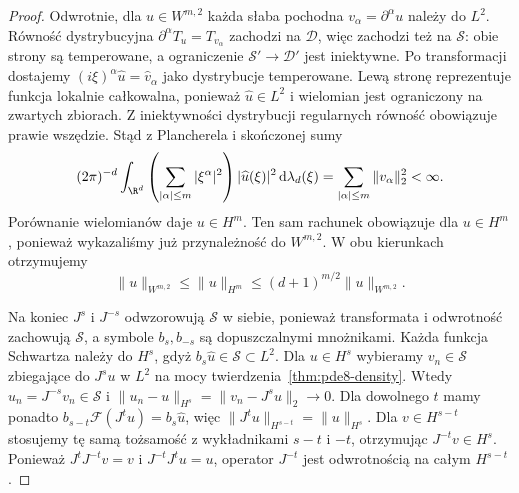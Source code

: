 \begin{proof}
Odwrotnie, dla $u\in W^{m,2}$ każda słaba
pochodna $v_\alpha=\partial^\alpha u$ należy
do $L^2$. Równość dystrybucyjna
$\partial^\alpha T_u=T_{v_\alpha}$ zachodzi
na $\mathcal D$, więc zachodzi też na $\mathcal S$:
obie strony są temperowane, a ograniczenie
$\mathcal S'\to\mathcal D'$ jest iniektywne.
Po transformacji dostajemy
$(i\xi)^\alpha\widehat u=\widehat v_\alpha$
jako dystrybucje temperowane.
Lewą stronę reprezentuje funkcja lokalnie
całkowalna, ponieważ $\widehat u\in L^2$
i wielomian jest ograniczony na zwartych zbiorach.
Z iniektywności dystrybucji regularnych
równość obowiązuje prawie wszędzie.
Stąd z Plancherela i skończonej sumy
\[
 (2\pi)^{-d}\int_{\R^d}
 \left(\sum_{|\alpha|\le m}|\xi^\alpha|^2\right)
 |\widehat u(\xi)|^2\,\mathrm d\lambda_d(\xi)
 =\sum_{|\alpha|\le m}\|v_\alpha\|_2^2<\infty.
\]
Porównanie wielomianów daje $u\in H^m$.
Ten sam rachunek obowiązuje dla $u\in H^m$,
ponieważ wykazaliśmy już przynależność
do $W^{m,2}$. W obu kierunkach otrzymujemy
\[
 \|u\|_{W^{m,2}}\le\|u\|_{H^m}
 \le(d+1)^{m/2}\|u\|_{W^{m,2}}.
\]

Na koniec $J^s$ i $J^{-s}$ odwzorowują
$\mathcal S$ w siebie, ponieważ transformata
i odwrotność zachowują $\mathcal S$,
a symbole $b_s,b_{-s}$ są dopuszczalnymi
mnożnikami. Każda funkcja Schwartza należy
do $H^s$, gdyż $b_s\widehat u\in\mathcal S\subset L^2$.
Dla $u\in H^s$ wybieramy $v_n\in\mathcal S$
zbiegające do $J^su$ w $L^2$ na mocy
twierdzenia~\ref{thm:pde8-density}. Wtedy
$u_n=J^{-s}v_n\in\mathcal S$ i
$\|u_n-u\|_{H^s}=\|v_n-J^su\|_2\to0$.
Dla dowolnego $t$ mamy ponadto
$b_{s-t}\mathcal F(J^tu)=b_s\widehat u$,
więc $\|J^tu\|_{H^{s-t}}=\|u\|_{H^s}$.
Dla $v\in H^{s-t}$ stosujemy tę samą tożsamość
z wykładnikami $s-t$ i $-t$, otrzymując
$J^{-t}v\in H^s$.
Ponieważ $J^tJ^{-t}v=v$ i $J^{-t}J^tu=u$,
operator $J^{-t}$ jest odwrotnością na całym
$H^{s-t}$.
\end{proof}

